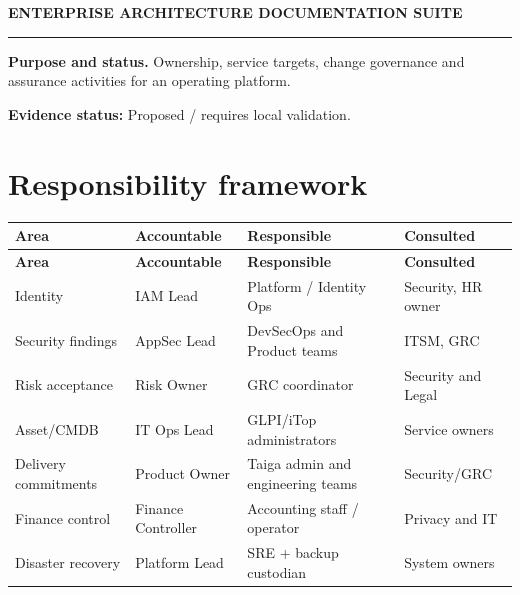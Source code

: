 \documentclass[10pt,letterpaper]{article}
\begin{document}
\begin{center}
{\large\bfseries\color{teal} ENTERPRISE ARCHITECTURE DOCUMENTATION SUITE}\par
{}\par
{}\par
\end{center}
\vspace{8pt}\hrule\vspace{12pt}
\textbf{Purpose and status.} Ownership, service targets, change governance and assurance activities for an operating platform.\par
\textbf{Evidence status:} Proposed / requires local validation.\par
\section{Responsibility framework}
\small\begin{longtable}{>{\raggedright\arraybackslash}p{}>{\raggedright\arraybackslash}p{}>{\raggedright\arraybackslash}p{}>{\raggedright\arraybackslash}p{}}
\toprule
\textbf{Area} & \textbf{Accountable} & \textbf{Responsible} & \textbf{Consulted}\\
\midrule\endfirsthead
\toprule
\textbf{Area} & \textbf{Accountable} & \textbf{Responsible} & \textbf{Consulted}\\
\midrule\endhead
Identity & IAM Lead & Platform / Identity Ops & Security, HR owner\\
Security findings & AppSec Lead & DevSecOps and Product teams & ITSM, GRC\\
Risk acceptance & Risk Owner & GRC coordinator & Security and Legal\\
Asset/CMDB & IT Ops Lead & GLPI/iTop administrators & Service owners\\
Delivery commitments & Product Owner & Taiga admin and engineering teams & Security/GRC\\
Finance control & Finance Controller & Accounting staff / operator & Privacy and IT\\
Disaster recovery & Platform Lead & SRE + backup custodian & System owners\\
\bottomrule
\end{longtable}
\normalsize
\end{document}
